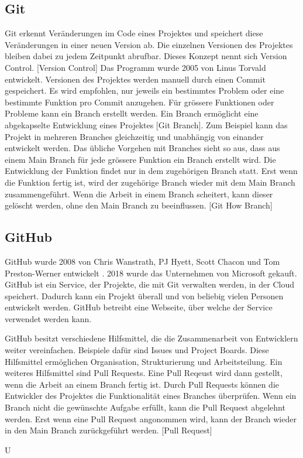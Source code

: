 \subsection{Git}
Git erkennt Veränderungen im Code eines Projektes und speichert diese
Veränderungen in einer neuen Version ab. Die einzelnen Versionen des Projektes
bleiben dabei zu jedem Zeitpunkt abrufbar. Dieses Konzept nennt sich Version
Control. [Version Control] Das Programm wurde 2005 von Linus Torvald entwickelt. 
Versionen des Projektes werden manuell durch einen Commit gespeichert. Es wird
empfohlen, nur jeweils ein bestimmtes Problem oder eine bestimmte Funktion pro
Commit anzugehen. Für grössere Funktionen oder Probleme kann ein Branch erstellt
werden. Ein Branch ermöglicht eine abgekapselte Entwicklung eines Projektes [Git Branch]. Zum
Beispiel kann das Projekt in mehreren Branches gleichzeitig und unabhängig von
einander entwickelt werden. Das übliche Vorgehen mit Branches sieht so aus, dass
aus einem Main Branch für jede grössere Funktion ein Branch erstellt wird.
Die Entwicklung der Funktion findet nur in dem zugehörigen Branch statt. Erst
wenn die Funktion fertig ist, wird der zugehörige Branch wieder mit dem Main
Branch zusammengeführt. Wenn die Arbeit in einem Branch scheitert, kann dieser
gelöscht werden, ohne den Main Branch zu beeinflussen. [Git How Branch]

\subsection{GitHub}
GitHub wurde 2008 von Chris Wanstrath, PJ Hyett, Scott Chacon und Tom
Preston-Werner entwickelt \cite{noauthor_github_2021}. 2018 wurde das
Unternehmen von Microsoft gekauft. GitHub ist ein Service, der Projekte, die mit
Git verwalten werden, in der Cloud speichert. Dadurch kann ein Projekt überall
und von beliebig vielen Personen entwickelt werden. GitHub betreibt eine
Webseite, über welche der Service verwendet werden kann.
\cite{noauthor_github_2021} 

GitHub besitzt verschiedene Hilfsmittel, die die Zusammenarbeit von Entwicklern
weiter vereinfachen. Beispiele dafür sind Issues und Project Boards. Diese
Hilfsmittel ermöglichen Organisation, Strukturierung und Arbeitsteilung. Ein
weiteres Hilfsmittel sind Pull Requests. Eine Pull Reqeust wird dann gestellt,
wenn die Arbeit an einem Branch fertig ist. Durch Pull Requests können die
Entwickler des Projektes die Funktionalität eines Branches überprüfen. Wenn ein
Branch nicht die gewünschte Aufgabe erfüllt, kann die Pull Request abgelehnt
werden. Erst wenn eine Pull Request angonommen wird, kann der Branch wieder in
den Main Branch zurückgeführt werden. [Pull Request]








U
